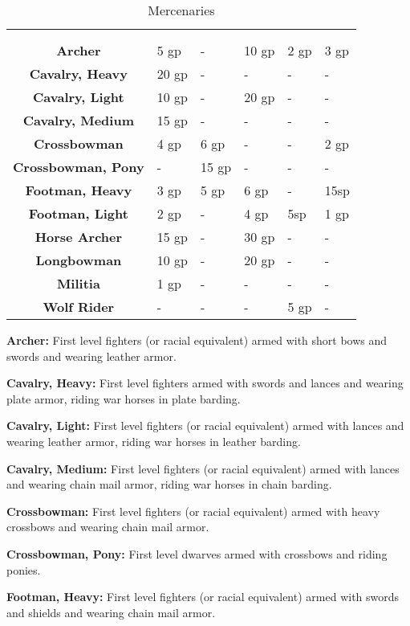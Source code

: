 \begin{multicols*}{2}
\begin {table}[H]
  \caption{Mercenaries}
	\begin{tabularx}{\columnwidth}{>{\bfseries}cM{.35in}YYM{.38in}Y}
		\thead{} & \setcounter{rownum}{0}\\
		 &  &  &  &  & \\
		Archer & 5 gp & - & 10 gp & 2 gp & 3 gp\\
		Cavalry, Heavy & 20 gp & - & - & - & -\\
		Cavalry, Light & 10 gp & - & 20 gp & - & -\\
		Cavalry, Medium & 15 gp & - & - & - & -\\
		Crossbowman & 4 gp & 6 gp & - & - & 2 gp\\
		Crossbowman, Pony & - & 15 gp & - & - & -\\
		Footman, Heavy & 3 gp & 5 gp & 6 gp & - & 15sp\\
		Footman, Light & 2 gp & - & 4 gp & 5sp & 1 gp\\
		Horse Archer & 15 gp & - & 30 gp & - & -\\
		Longbowman & 10 gp & - & 20 gp & - & -\\
		Militia & 1 gp & - & - & - & -\\
		Wolf Rider & - & - & - & 5 gp & -\
  \end {tabularx}
\end {table}

\textbf{Archer:} First level fighters (or racial equivalent) armed with short bows and swords and wearing leather armor.

\textbf{Cavalry, Heavy:} First level fighters armed with swords and lances and wearing plate armor, riding war horses in plate barding.

\textbf{Cavalry, Light:} First level fighters (or racial equivalent) armed with lances and wearing leather armor, riding war horses in leather barding.

\textbf{Cavalry, Medium:} First level fighters (or racial equivalent) armed with lances and wearing chain mail armor, riding war horses in chain barding.

\textbf{Crossbowman:} First level fighters (or racial equivalent) armed with heavy crossbows and wearing chain mail armor.

\textbf{Crossbowman, Pony:} First level dwarves armed with crossbows and riding ponies.

\textbf{Footman, Heavy:} First level fighters (or racial equivalent) armed with swords and shields and wearing chain mail armor.


\end{multicols*}
